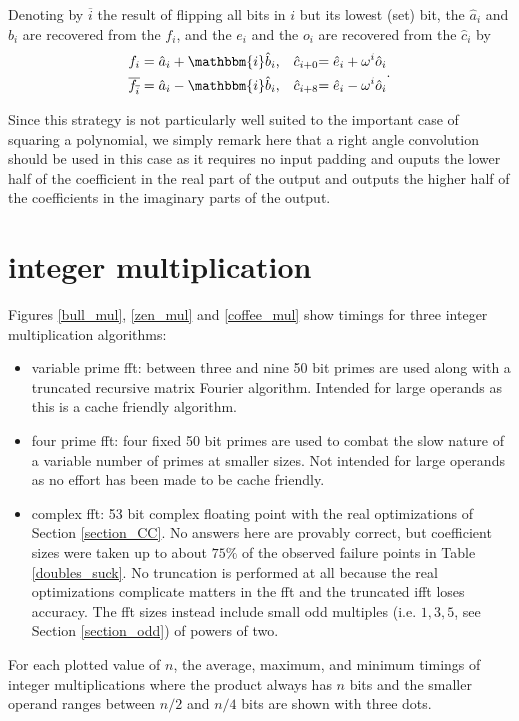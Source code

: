 \documentclass[12 pt]{amsart}
\newcommand{\ii}[0] {\mathbbm{i}}
\begin{document}
Denoting by $\overline{i}$ the result of flipping all bits in $i$ but its lowest (set) bit, the $\hat{a}_i$ and $\hat{b}_i$ are recovered from the $f_i$, and the $e_i$ and
the $o_i$ are recovered from the $\hat{c}_i$ by
\begin{equation*}
\begin{alignedat}{6}
f_{i} &= \hat{a}_i + \ii \hat{b}_i&\text{,}& \quad \hat{c}_{i+0} &= \hat{e}_i + \omega^i \hat{o}_i\\
\overline{f_{\overline{i}}} &= \hat{a}_i - \ii \hat{b}_i &\text{,}& \quad \hat{c}_{i+8} &= \hat{e}_i - \omega^i \hat{o}_i
\end{alignedat}
\text{.}
\end{equation*}

Since this strategy is not particularly well suited to the important case of 
squaring a polynomial, we simply remark here that a right angle convolution
should be used in this case as it requires no input padding and ouputs the lower
half of the coefficient in the real part of the output and outputs the higher
half of the coefficients in the imaginary parts of the output.

\section{integer multiplication}
\label{section_mul}

Figures \ref{bull_mul}, \ref{zen_mul} and \ref{coffee_mul} show timings for
three integer multiplication algorithms:

\begin{itemize}
\item{variable prime fft: between three and nine 50 bit primes are used along
with a truncated recursive matrix Fourier algorithm. Intended for large
operands as this is a cache friendly algorithm.}
\item{four prime fft: four fixed 50 bit primes are used to combat the slow
nature of a variable number of primes at smaller sizes. Not intended for large
operands as no effort has been made to be cache friendly.}
\item{complex fft: 53 bit complex floating point with the real optimizations of
Section \ref{section_CC}. No answers here are provably correct, but coefficient
sizes were taken up to about $75\%$ of the observed failure points in
Table \ref{doubles_suck}. No truncation is performed at all because the real
optimizations complicate matters in the fft and the truncated ifft loses
accuracy. The fft sizes instead include small odd multiples
(i.e. $1,3,5$, see Section \ref{section_odd}) of powers of two.}
\end{itemize}
For each plotted value of $n$, the average, maximum, and minimum timings of 
integer multiplications where the product always has $n$ bits and the
smaller operand ranges between $n/2$ and $n/4$ bits are shown with three dots.
\end{document}
